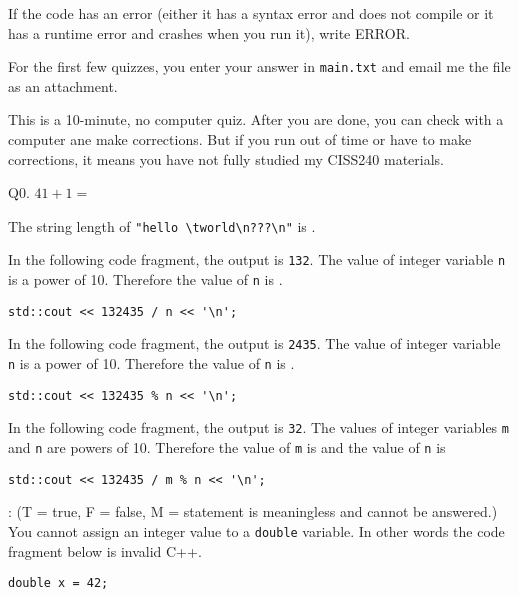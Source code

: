 

\renewcommand\AUTHOR{crsmith14@cougars.ccis.edu} %


\topmattertwo

If the code has an error (either it has a syntax error and
does not compile or it has a runtime error and crashes when you run it),
write ERROR.

For the first few quizzes, you enter your answer in \verb!main.txt!
and email me the file as an attachment.

This is a 10-minute, no computer quiz. After you are done, you can
check with a computer ane make corrections.
But if you run out of time or have to make corrections, it means you have
not fully studied my CISS240 materials.

Q0. $41 + 1 = $ 

\nextq
The string length of
\verb!"hello \tworld\n???\n"!
is \answerbox{}.


\nextq
In the following code fragment, the output is \verb!132!.
The value of integer variable \verb!n! is a power of 10.
Therefore the value of \verb!n! is \answerbox{}.
\begin{Verbatim}[frame=single]
std::cout << 132435 / n << '\n';
\end{Verbatim}


\nextq
In the following code fragment, the output is \verb!2435!.
The value of integer variable \verb!n! is a power of 10.
Therefore the value of \verb!n! is \answerbox{}.
\begin{Verbatim}[frame=single]
std::cout << 132435 % n << '\n';
\end{Verbatim}


\nextq
In the following code fragment, the output is \verb!32!.
The values of integer variables \verb!m! and \verb!n! are
powers of 10.
Therefore
the value of \verb!m! is \answerbox{}
and
the value of \verb!n! is \answerbox{}
\begin{Verbatim}[frame=single]
std::cout << 132435 / m % n << '\n';
\end{Verbatim}


\nextq
\tf:
(T = true, F = false, M = statement is meaningless and cannot be answered.)
You cannot assign an integer value to a \verb!double! variable.
In other words the code fragment below is invalid C++.
\dotfill\answerbox{}
\begin{Verbatim}[frame=single]
double x = 42;
\end{Verbatim}

